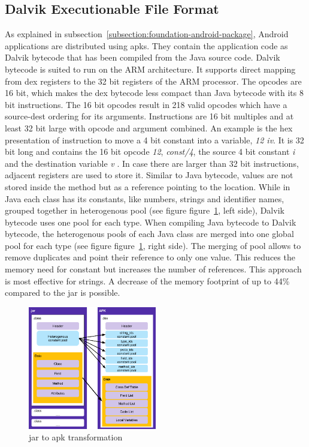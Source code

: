 \subsection{Dalvik Executionable File Format} \label{subsection:android-dex}
As explained in subsection~\ref{subsection:foundation-android-package}, Android applications are distributed using \gls{apk}s.
They contain the application code as Dalvik bytecode that has been compiled from the Java source code.
\newline
Dalvik bytecode is suited to run on the ARM architecture.
It supports direct mapping from dex registers to the 32 bit registers of the ARM processor.
The opcodes are 16 bit, which makes the dex bytecode less compact than Java bytecode with its 8 bit instructions.
The 16 bit opcodes result in 218 valid opcodes which have a source-dest ordering for its arguments.
Instructions are 16 bit multiples and at least 32 bit large with opcode and argument combined.
An example is the hex presentation of instruction to move a 4 bit constant into a variable,  \textit{12 iv}.
It is 32 bit long and contains the 16 bit opcode \textit{12}, \textit{const/4}, the source 4 bit constant \textit{i} and the destination variable \textit{v}  \cite{opcodes}.
In case there are larger than 32 bit instructions, adjacent registers are used to store it. \cite{androidDalvik}
\newline
Similar to Java bytecode, values are not stored inside the method but as a reference pointing to the location.
While in Java each class has its constants, like numbers, strings and identifier names, grouped together in heterogenous pool (see figure figure~\ref{fig:java}, left side), Dalvik bytecode uses one pool for each type.
When compiling Java bytecode to Dalvik bytecode, the heterogenous pools of each Java class are merged into one global pool for each type (see figure figure~\ref{fig:java}, right side).
The merging of pool allows to remove duplicates and point their reference to only one value.
This reduces the memory need for constant but increases the number of references.
This approach is most effective for strings.
A decrease of the memory footprint of up to 44\% compared to the \gls{jar} is possible.
\newline
\begin{figure}[h]
    \centering
    \includegraphics[width=0.5\textwidth]{data/java.png}
    \caption{\gls{jar} to \gls{apk} transformation \cite{googleDalvik}}
    \label{fig:java}
\end{figure}
